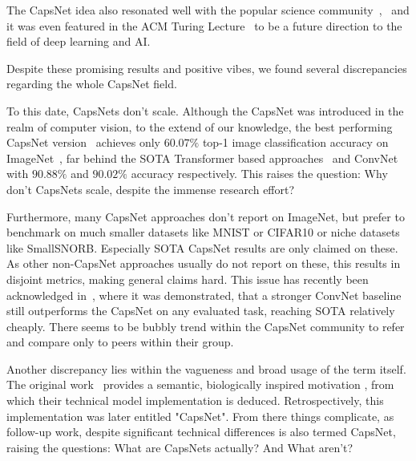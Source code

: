 \documentclass{article}
\begin{document}
The CapsNet idea also resonated well with the popular science community~\cite{book/hawkins2021},~\cite{book/Hiesinger2021} and it was even featured in the ACM Turing Lecture~\cite{comacm/Bengio2021} to be a future direction to the field of deep learning and AI.

Despite these promising results and positive vibes, we found several discrepancies regarding the whole CapsNet field.

To this date, CapsNets don't scale. Although the CapsNet was introduced in the realm of computer vision, to the extend of our knowledge, the best performing CapsNet version~\cite{nips/AhmedT19} achieves only $60.07\%$ top-1 image classification accuracy on ImageNet~\cite{data/imagenet}, far behind the SOTA Transformer based approaches~\cite{corr/Wortsman2022} and  ConvNet~\cite{cvpr/Pham2021} with $90.88\%$ and  $90.02\%$ accuracy respectively.
This raises the question: Why don't CapsNets scale, despite the immense research effort?

Furthermore, many CapsNet approaches don't report on ImageNet, but prefer to benchmark on much smaller datasets like MNIST or CIFAR10 or niche datasets like SmallSNORB. %
Especially SOTA CapsNet results are only claimed on these. %
As other non-CapsNet approaches usually do not report on these, this results in disjoint metrics, making general claims hard.
This issue has recently been acknowledged in~\cite{cvpr/GuT021}, where it was demonstrated, that a stronger ConvNet baseline still outperforms the CapsNet on any evaluated task, reaching SOTA relatively cheaply.
There seems to be bubbly trend within the CapsNet community to refer and compare only to peers within their group.

Another discrepancy lies within the vagueness and broad usage of the term itself.
The original work~\cite{nips/SabourFH17} provides a semantic, biologically inspired motivation , from which their technical model implementation is deduced. Retrospectively, this implementation was later entitled "CapsNet".
From there things complicate, as follow-up work, despite significant technical differences is also termed CapsNet, raising the questions: What are CapsNets actually? And What aren't?
\end{document}
